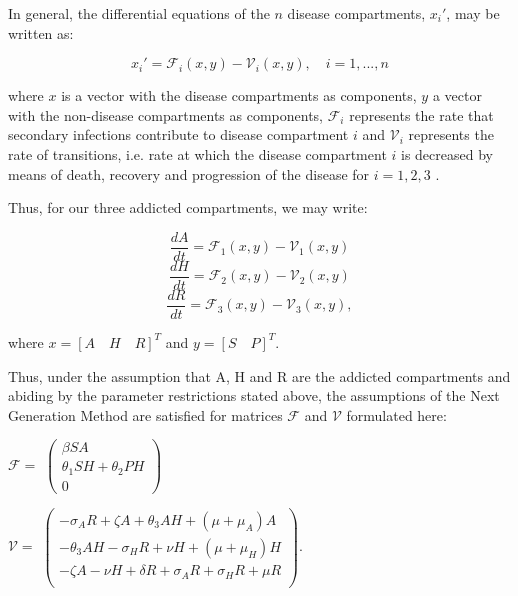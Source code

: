 \documentclass[12pt]{article}
\begin{document}
In general, the differential equations of the $n$ disease compartments, $x_i'$, may be written as: 

\[{x_i'} = \mathscr{F}_{i} (x,y)-\mathscr{V}_i (x,y),\quad i=1,...,n\] 

where $x$ is a vector with the disease compartments as components, $y$ a vector with the non-disease compartments as components, $\mathscr{F}_{i}$ represents the rate that secondary infections contribute to disease compartment $i$ and $\mathscr{V}_{i}$ represents the rate of transitions, i.e. rate at which the disease compartment $i$ is decreased by means of death, recovery and progression of the disease for $i=1,2,3$ \cite{Driessche}. 

Thus, for our three addicted compartments, we may write: 

$$\dfrac{dA}{dt} = \mathscr{F}_{1} (x,y)-\mathscr{V}_{1}(x,y)$$
$$\dfrac{dH}{dt} = \mathscr{F}_{2} (x,y)-\mathscr{V}_{2}(x,y)$$
$$\dfrac{dR}{dt} = \mathscr{F}_{3} (x,y)-\mathscr{V}_{3}(x,y),$$

where $x= {[A\quad H\quad R]}^{T}$ and $y= {[S\quad P]}^{T}$.



Thus, under the assumption that A, H and R are the addicted compartments and abiding by the parameter restrictions stated above, the assumptions of the Next Generation Method are satisfied for matrices $\mathscr{F}$ and $\mathscr{V}$ formulated here:

\begin{center}
$\mathscr{F}=$
$ \begin{pmatrix}

\beta SA \\
\theta_{1}SH+\theta_{2}PH \\
0
\end{pmatrix}$



$\mathscr{V}=$
$ \begin{pmatrix}

-\sigma_{A}R+\zeta A+\theta_{3} AH + (\mu +\mu_{A})A \\
-\theta_{3}AH-\sigma_{H}R+\nu H +(\mu +\mu_{H}) H \\
-\zeta A -\nu H +\delta R +\sigma_{A}R +\sigma_{H}R +\mu R\\
\end{pmatrix}$.
\end{center}
\end{document}
